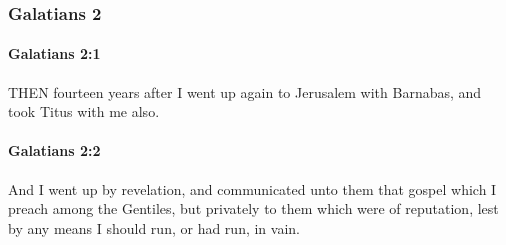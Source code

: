 	\subsubsection{Galatians 2} %
		\label{GALATIANS-2}
		
		\paragraph{Galatians 2:1} %
			\label{GALATIANS-2-1}

			THEN fourteen years after I went up again to Jerusalem with Barnabas, and took Titus with me also.

			\begin{framed}
			\scriptsize
				\begin{compactdesc}
					\item[SBLG] 
				\end{compactdesc}
			\end{framed}

		\paragraph{Galatians 2:2} %
			\label{GALATIANS-2-2}

			And I went up by revelation, and communicated unto them that gospel which I preach among the Gentiles, but privately to them which were of reputation, lest by any means I should run, or had run, in vain.

